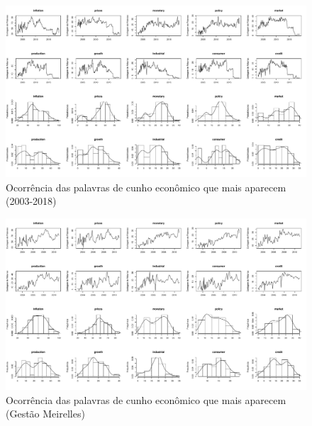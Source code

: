 \begin{landscape}
\begin{figure}
    \centering
    \includegraphics[width=1.5\textwidth]{capitulos/figures/analiseeconomicageral.pdf}
    \caption{Ocorrência das palavras de cunho econômico que mais aparecem (2003-2018)}
    \label{fig:analiseeconomicageral}
\end{figure}
\end{landscape}

\begin{landscape}
\begin{figure}
    \centering
    \includegraphics[width=1.5\textwidth]{capitulos/figures/analiseeconomicameirelles.pdf}
    \caption{Ocorrência das palavras de cunho econômico que mais aparecem (Gestão Meirelles)}
    \label{fig:analiseeconomicameirelles}
\end{figure}
\end{landscape}


